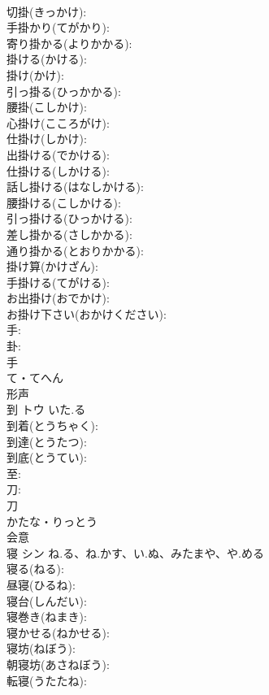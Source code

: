 \documentclass[8pt]{extreport}
\begin{document}
\begin{CJK}{UTF8}{min}
\\	切掛(きっかけ): 
\\	手掛かり(てがかり): 
\\	寄り掛かる(よりかかる): 
\\	掛ける(かける): 
\\	掛け(かけ): 
\\	引っ掛る(ひっかかる): 
\\	腰掛(こしかけ): 
\\	心掛け(こころがけ): 
\\	仕掛け(しかけ): 
\\	出掛ける(でかける): 
\\	仕掛ける(しかける): 
\\	話し掛ける(はなしかける): 
\\	腰掛ける(こしかける): 
\\	引っ掛ける(ひっかける): 
\\	差し掛かる(さしかかる): 
\\	通り掛かる(とおりかかる): 
\\	掛け算(かけざん): 
\\	手掛ける(てがける): 
\\	お出掛け(おでかけ): 
\\	お掛け下さい(おかけください): 
\\	手: 
\\	卦: 
\\	手	
\\	て・てへん	
\\	形声 
\\	到	トウ	いた.る		
\\	到着(とうちゃく): 
\\	到達(とうたつ): 
\\	到底(とうてい): 
\\	至: 
\\	刀: 
\\	刀	
\\	かたな・りっとう	
\\	会意 
\\	寝	シン	ね.る、ね.かす、い.ぬ、みたまや、や.める		
\\	寝る(ねる): 
\\	昼寝(ひるね): 
\\	寝台(しんだい): 
\\	寝巻き(ねまき): 
\\	寝かせる(ねかせる): 
\\	寝坊(ねぼう): 
\\	朝寝坊(あさねぼう): 
\\	転寝(うたたね): 

\end{CJK}
\end{document}
